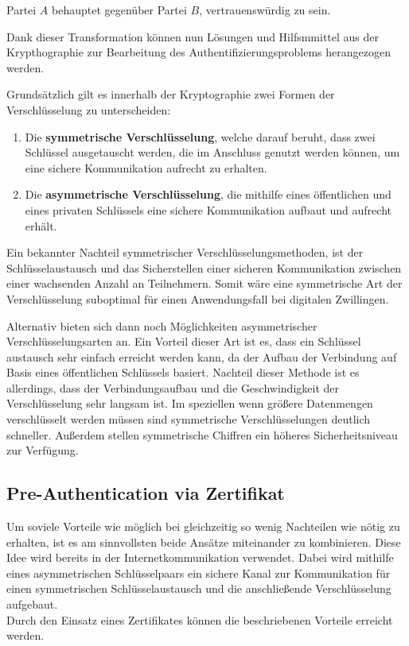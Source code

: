 \begin{problem}[Authentifizierung]
    Partei $A$ behauptet gegenüber Partei $B$, vertrauenswürdig zu sein.
\end{problem}

Dank dieser Transformation können nun Lösungen und Hilfsmmittel aus der Krypthographie zur Bearbeitung des Authentifizierungsproblems herangezogen werden.

Grundsätzlich gilt es innerhalb der Kryptographie zwei Formen der Verschlüsselung zu unterscheiden:

\begin{enumerate}
    \item Die \textbf{symmetrische Verschlüsselung}, welche darauf beruht, dass zwei Schlüssel ausgetauscht werden, die im Anschluss genutzt werden können, um eine sichere Kommunikation aufrecht zu erhalten.
    \item  Die \textbf{asymmetrische Verschlüsselung}, die mithilfe eines öffentlichen und eines privaten Schlüssels eine sichere Kommunikation aufbaut und aufrecht erhält.
\end{enumerate}

Ein bekannter Nachteil symmetrischer Verschlüsselungsmethoden, ist der Schlüsselaustausch und das Sicherstellen einer sicheren Kommunikation zwischen einer wachsenden Anzahl an Teilnehmern. Somit wäre eine symmetrische Art der Verschlüsselung suboptimal für einen Anwendungsfall bei digitalen Zwillingen. 

Alternativ bieten sich dann noch Möglichkeiten asymmetrischer Verschlüsselungsarten an. Ein Vorteil dieser Art ist es, dass ein Schlüssel austausch sehr einfach erreicht werden kann, da der Aufbau der Verbindung auf Basis eines öffentlichen Schlüssels basiert. Nachteil dieser Methode ist es allerdings, dass der Verbindungsaufbau und die Geschwindigkeit der Verschlüsselung sehr langsam ist. Im speziellen wenn größere Datenmengen verschlüsselt werden müssen sind symmetrische Verschlüsselungen deutlich schneller. Außerdem stellen symmetrische Chiffren ein höheres Sicherheitsniveau zur Verfügung.

\subsection{Pre-Authentication via Zertifikat}
\label{sec:certificate}

Um soviele Vorteile wie möglich bei gleichzeitig so wenig Nachteilen wie nötig zu erhalten, ist es am sinnvollsten beide Ansätze miteinander zu kombinieren. Diese Idee wird bereits in der Internetkommunikation verwendet. Dabei wird mithilfe eines asymmetrischen Schlüsselpaars ein sichere Kanal zur Kommunikation für einen symmetrischen Schlüsselaustausch und die anschließende Verschlüsselung aufgebaut. \\
Durch den Einsatz eines Zertifikates können die beschriebenen Vorteile erreicht werden.

